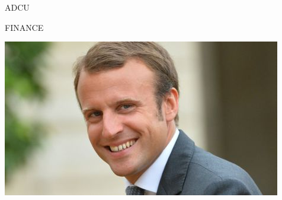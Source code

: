 
\thispagestyle{empty}

\vfill

\vspace*{1cm}

\begin{center}
{\fontsize{30}{40}\selectfont{}ADCU}
\end{center}

\vspace{2cm}

\begin{center}
{\fontsize{25}{30}\selectfont \textsc{FINANCE}}
\end{center}

\vspace{2cm}

\begin{center}
  \includegraphics[scale=0.45]{assets/cover}
\end{center}


\vfill


\newpage

\newpage
